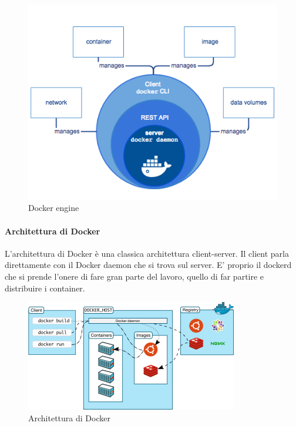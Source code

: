 \begin{figure}[h!]
	\centering
	\includegraphics[width=\textwidth,keepaspectratio=true]{capitoli/imgs/dockerThinking.png}
	\caption{Docker engine}
\end{figure}

\paragraph{Architettura di Docker}
L'architettura di Docker è una classica architettura client-server. Il client parla direttamente con il Docker daemon che si trova sul server. E' proprio il dockerd che si prende l'onere di fare gran parte del lavoro, quello di far partire e distribuire i container.
\begin{figure}[h!]
	\centering
	\includegraphics[width=\textwidth,keepaspectratio=true]{capitoli/imgs/architecturedocker.png}
	\caption{Architettura di Docker}
\end{figure}
